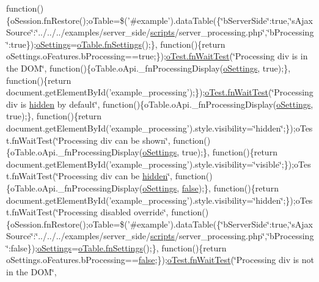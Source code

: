 \begin{DoxyCompactItemize}
function()\{o\+Session.\+fn\+Restore();o\+Table=\$('\#example').data\+Table(\{\char`\"{}b\+Server\+Side\char`\"{}\+:true,\char`\"{}s\+Ajax\+Source\char`\"{}\+:\char`\"{}../../../examples/server\+\_\+side/\hyperlink{tinymce_8jquery_8dev_8js_a09066d4d580eeec222f858d588b4cdef}{scripts}/server\+\_\+processing.\+php\char`\"{},\char`\"{}b\+Processing\char`\"{}\+:true\});\hyperlink{model_8settings_8js_a4857b9c813b4dea010668e9555d0aca7}{o\+Settings}=\hyperlink{api_8methods_8js_a78f387fab92a85c2cb7830bc5d8a6141}{o\+Table.\+fn\+Settings}();\}, function()\{return o\+Settings.\+o\+Features.\+b\+Processing==true;\});\hyperlink{onhold_24__server-side_2__zero__config_8js_ab25c4d596771c0133cdc45178ce72c3d}{o\+Test.\+fn\+Wait\+Test}(\char`\"{}Processing div is in the D\+O\+M\char`\"{}, function()\{o\+Table.\+o\+Api.\+\_\+fn\+Processing\+Display(\hyperlink{model_8settings_8js_a4857b9c813b4dea010668e9555d0aca7}{o\+Settings}, true);\}, function()\{return document.\+get\+Element\+By\+Id('example\+\_\+processing');\});\hyperlink{onhold_24__server-side_2__zero__config_8js_ab25c4d596771c0133cdc45178ce72c3d}{o\+Test.\+fn\+Wait\+Test}(\char`\"{}Processing div is \hyperlink{media_2js_2jquery_8js_a6d83a3278d86577a50e8a86937570a90}{hidden} by default\char`\"{}, function()\{o\+Table.\+o\+Api.\+\_\+fn\+Processing\+Display(\hyperlink{model_8settings_8js_a4857b9c813b4dea010668e9555d0aca7}{o\+Settings}, true);\}, function()\{return document.\+get\+Element\+By\+Id('example\+\_\+processing').style.\+visibility=\char`\"{}hidden\char`\"{};\});o\+Test.\+fn\+Wait\+Test(\char`\"{}Processing div can be shown\char`\"{}, function()\{o\+Table.\+o\+Api.\+\_\+fn\+Processing\+Display(\hyperlink{model_8settings_8js_a4857b9c813b4dea010668e9555d0aca7}{o\+Settings}, true);\}, function()\{return document.\+get\+Element\+By\+Id('example\+\_\+processing').style.\+visibility=\char`\"{}visible\char`\"{};\});o\+Test.\+fn\+Wait\+Test(\char`\"{}Processing div can be \hyperlink{media_2js_2jquery_8js_a6d83a3278d86577a50e8a86937570a90}{hidden}\char`\"{}, function()\{o\+Table.\+o\+Api.\+\_\+fn\+Processing\+Display(\hyperlink{model_8settings_8js_a4857b9c813b4dea010668e9555d0aca7}{o\+Settings}, \hyperlink{validate_8js_a5df37b7f02e5cdc7d9412b7f872b8e01}{false});\}, function()\{return document.\+get\+Element\+By\+Id('example\+\_\+processing').style.\+visibility=\char`\"{}hidden\char`\"{};\});o\+Test.\+fn\+Wait\+Test(\char`\"{}Processing disabled override\char`\"{}, function()\{o\+Session.\+fn\+Restore();o\+Table=\$('\#example').data\+Table(\{\char`\"{}b\+Server\+Side\char`\"{}\+:true,\char`\"{}s\+Ajax\+Source\char`\"{}\+:\char`\"{}../../../examples/server\+\_\+side/\hyperlink{tinymce_8jquery_8dev_8js_a09066d4d580eeec222f858d588b4cdef}{scripts}/server\+\_\+processing.\+php\char`\"{},\char`\"{}b\+Processing\char`\"{}\+:false\});\hyperlink{model_8settings_8js_a4857b9c813b4dea010668e9555d0aca7}{o\+Settings}=\hyperlink{api_8methods_8js_a78f387fab92a85c2cb7830bc5d8a6141}{o\+Table.\+fn\+Settings}();\}, function()\{return o\+Settings.\+o\+Features.\+b\+Processing==\hyperlink{validate_8js_a5df37b7f02e5cdc7d9412b7f872b8e01}{false};\});\hyperlink{onhold_24__server-side_2__zero__config_8js_ab25c4d596771c0133cdc45178ce72c3d}{o\+Test.\+fn\+Wait\+Test}(\char`\"{}Processing div is not in the D\+O\+M\char`\"{}, 
\end{DoxyCompactItemize}
